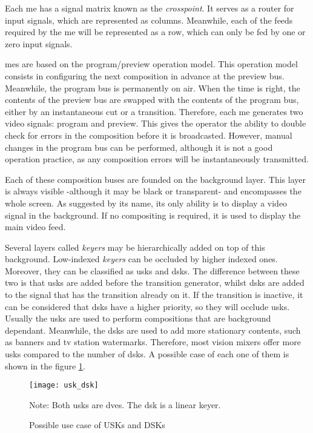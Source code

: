 \documentclass[../main.tex]{subfiles}
\begin{document}
Each \gls{me} has a signal matrix known as the \textit{crosspoint}. It serves as a router for input signals, which are represented as columns. Meanwhile, each of the feeds required by the \gls{me} will be represented as a row, which can only be fed by one or zero input signals.\newline

\Glspl{me} are based on the program/preview operation model. This operation model consists in configuring the next composition in advance at the preview bus. Meanwhile, the program bus is permanently on air. When the time is right, the contents of the preview bus are swapped with the contents of the program bus, either by an instantaneous cut or a transition. Therefore, each \gls{me} generates two video signals: program and preview. This gives the operator the ability to double check for errors in the composition before it is broadcasted. However, manual changes in the program bus can be performed, although it is not a good operation practice, as any composition errors will be instantaneously transmitted.\newline

Each of these composition buses are founded on the background layer. This layer is always visible -although it may be black or transparent- and encompasses the whole screen. As suggested by its name, its only ability is to display a video signal in the background. If no compositing is required, it is used to display the main video feed.\newline

Several layers called \textit{keyers} may be hierarchically added on top of this background. Low-indexed \textit{keyers} can be occluded by higher indexed ones. Moreover, they can be classified as \glspl{usk} and \glspl{dsk}. The difference between these two is that \glspl{usk} are added before the transition generator, whilst \glspl{dsk} are added to the signal that has the transition already on it. If the transition is inactive, it can be considered that \glspl{dsk} have a higher priority, so they will occlude \glspl{usk}. Usually the \glspl{usk} are used to perform compositions that are background dependant. Meanwhile, the \glspl{dsk} are used to add more stationary contents, such as banners and \gls{tv} station watermarks. Therefore, most vision mixers offer more \glspl{usk} compared to the number of \glspl{dsk}. A possible case of each one of them is shown in the figure \ref{fig:02:usk_dsk_example}.

\begin{figure}[htbp]
    \centering
    \texttt{[image: usk\_dsk]}

    Note: Both \glspl{usk} are \glspl{dve}. The \gls{dsk} is a linear keyer.
    \caption{Possible use case of USKs and DSKs}
    \label{fig:02:usk_dsk_example}
\end{figure}
\end{document}
